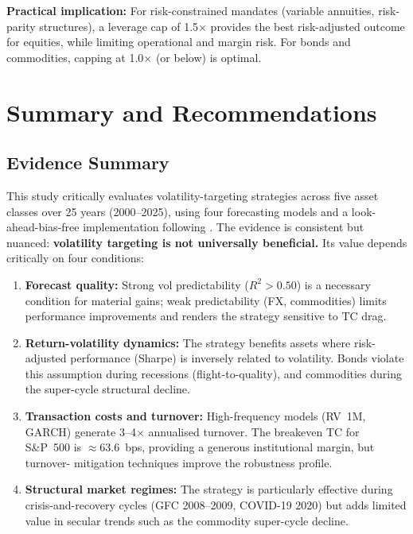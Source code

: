 \documentclass[12pt, a4paper]{article}
\begin{document}
\textbf{Practical implication:} For risk-constrained mandates (variable annuities,
risk-parity structures), a leverage cap of 1.5$\times$ provides the best
risk-adjusted outcome for equities, while limiting operational and margin risk. For
bonds and commodities, capping at 1.0$\times$ (or below) is optimal.


\section{Summary and Recommendations}
\label{sec:summary}

\subsection{Evidence Summary}

This study critically evaluates volatility-targeting strategies across five asset classes
over 25 years (2000--2025), using four forecasting models and a look-ahead-bias-free
implementation following \citet{Bongaerts2020}. The evidence is consistent but nuanced:
\textbf{volatility targeting is not universally beneficial.} Its value depends critically
on four conditions:

\begin{enumerate}
  \item \textbf{Forecast quality:} Strong vol predictability ($R^2 > 0.50$) is a
        necessary condition for material gains; weak predictability (FX, commodities)
        limits performance improvements and renders the strategy sensitive to TC drag.
  \item \textbf{Return-volatility dynamics:} The strategy benefits assets where
        risk-adjusted performance (Sharpe) is inversely related to volatility. Bonds
        violate this assumption during recessions (flight-to-quality), and commodities
        during the super-cycle structural decline.
  \item \textbf{Transaction costs and turnover:} High-frequency models (RV~1M, GARCH)
        generate 3--4$\times$ annualised turnover. The breakeven TC for S\&P~500 is
        $\approx$63.6~bps, providing a generous institutional margin, but turnover-
        mitigation techniques improve the robustness profile.
  \item \textbf{Structural market regimes:} The strategy is particularly effective during
        crisis-and-recovery cycles (GFC 2008--2009, COVID-19 2020) but adds limited
        value in secular trends such as the commodity super-cycle decline.
\end{enumerate}
\end{document}
